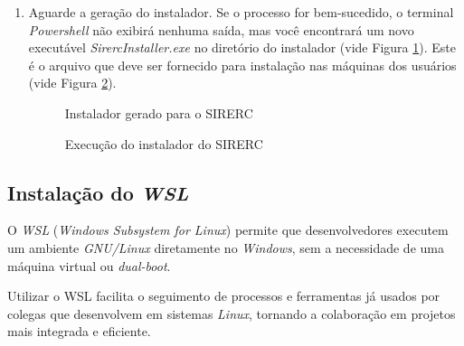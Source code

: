 \documentclass[a4paper,11pt]{article}
\newcommand{\sistema}{\textsf{SIRERC}}
\newcommand{\windows}{\textit{Windows}}
\begin{document}
\begin{enumerate}
\begin{enumerate}
		\item Aguarde a geração do instalador. Se o processo for bem-sucedido, o terminal \emph{Powershell} não exibirá nenhuma saída, mas você encontrará um novo executável \emph{SirercInstaller.exe} no diretório do instalador (vide Figura \ref{fig:sirercinstallerfinish}). Este é o arquivo que deve ser fornecido para instalação nas máquinas dos usuários (vide Figura \ref{fig:sirercinstaller}).
		
		\begin{figure}[H]\centering
			\caption{Instalador gerado para o \sistema{}}\label{fig:sirercinstallerfinish}
		\end{figure}
		
		\begin{figure}[H]\centering
			\caption{Execução do instalador do \sistema{}}\label{fig:sirercinstaller}
		\end{figure}
	\end{enumerate}
\end{enumerate}

\subsection{Instalação do \emph{WSL}}

O \textit{WSL} (\textit{Windows Subsystem for Linux}) permite que desenvolvedores executem um ambiente \textit{GNU/Linux} diretamente no \windows{}, sem a necessidade de uma máquina virtual ou \textit{dual-boot}.

Utilizar o WSL facilita o seguimento de processos e ferramentas já usados por colegas que desenvolvem em sistemas \textit{Linux}, tornando a colaboração em projetos mais integrada e eficiente.
\end{document}
